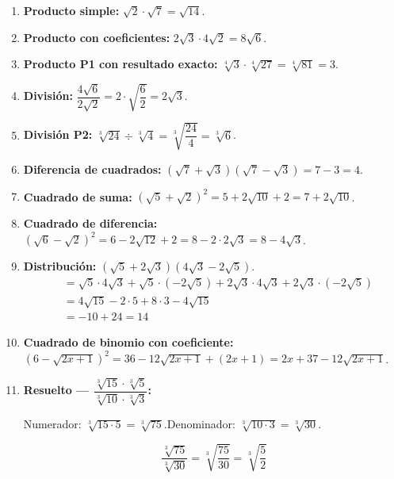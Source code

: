 \documentclass[11pt, letterpaper]{article}
\begin{document}
\begin{tcolorbox}[examplebox, title={Ejemplos}]
\begin{enumerate}[label=\textbf{Ej. \arabic*.}, leftmargin=*]

\item \textbf{Producto simple:} $\sqrt{2}\cdot\sqrt{7}=\sqrt{14}$.

\item \textbf{Producto con coeficientes:} $2\sqrt{3}\cdot 4\sqrt{2}=8\sqrt{6}$.

\item \textbf{Producto P1 con resultado exacto:} $\sqrt[4]{3}\cdot\sqrt[4]{27}=\sqrt[4]{81}=3$.

\item \textbf{División:} $\dfrac{4\sqrt{6}}{2\sqrt{2}}=2\cdot\sqrt{\dfrac{6}{2}}=2\sqrt{3}$.

\item \textbf{División P2:} $\sqrt[3]{24}\div\sqrt[3]{4}=\sqrt[3]{\dfrac{24}{4}}=\sqrt[3]{6}$.

\item \textbf{Diferencia de cuadrados:} $(\sqrt{7}+\sqrt{3})(\sqrt{7}-\sqrt{3})=7-3=4$.

\item \textbf{Cuadrado de suma:} $(\sqrt{5}+\sqrt{2})^2=5+2\sqrt{10}+2=7+2\sqrt{10}$.

\item \textbf{Cuadrado de diferencia:} $(\sqrt{6}-\sqrt{2})^2=6-2\sqrt{12}+2=8-2\cdot 2\sqrt{3}=8-4\sqrt{3}$.

\item \textbf{Distribución:} $(\sqrt{5}+2\sqrt{3})(4\sqrt{3}-2\sqrt{5})$.
\begin{align*}
&=\sqrt{5}\cdot 4\sqrt{3}+\sqrt{5}\cdot(-2\sqrt{5})+2\sqrt{3}\cdot 4\sqrt{3}+2\sqrt{3}\cdot(-2\sqrt{5})\\
&=4\sqrt{15}-2\cdot 5+8\cdot 3-4\sqrt{15}\\
&=-10+24=14
\end{align*}

\item \textbf{Cuadrado de binomio con coeficiente:} $(6-\sqrt{2x+1})^2=36-12\sqrt{2x+1}+(2x+1)=2x+37-12\sqrt{2x+1}$.

\item \textbf{Resuelto — $\dfrac{\sqrt[3]{15}\cdot\sqrt[3]{5}}{\sqrt[3]{10}\cdot\sqrt[3]{3}}$:}

Numerador: $\sqrt[3]{15\cdot 5}=\sqrt[3]{75}$.\quad Denominador: $\sqrt[3]{10\cdot 3}=\sqrt[3]{30}$.

$$\frac{\sqrt[3]{75}}{\sqrt[3]{30}}=\sqrt[3]{\frac{75}{30}}=\sqrt[3]{\frac{5}{2}}$$

\end{enumerate}
\end{tcolorbox}
\end{document}
